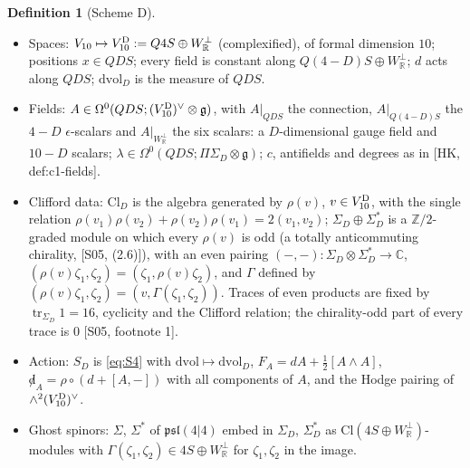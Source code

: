 \documentclass[11pt]{article}
\theoremstyle{definition}
\newtheorem{definition}{Definition}[section]
\numberwithin{equation}{section}
\begin{document}
\begin{definition}[Scheme D]
\label{def:schemeD}
\mbox{}\begin{itemize}
\item Spaces: $V_{10}\mapsto V_{10}^{\rm D}:=Q4S\oplus W^\perp_{\mathbb R}$ (complexified), of formal dimension $10$; positions $x\in QDS$; every field is constant along $Q(4{-}D)S\oplus W^\perp_{\mathbb R}$; $d$ acts along $QDS$; $\mathrm{dvol}_D$ is the measure of $QDS$.
\item Fields: $A\in\Omega^0(QDS;(V_{10}^{\rm D})^\vee\otimes\mathfrak g)$, with $A|_{QDS}$ the connection, $A|_{Q(4-D)S}$ the $4-D$ $\epsilon$-scalars and $A|_{W^\perp_{\mathbb R}}$ the six scalars: a $D$-dimensional gauge field and $10-D$ scalars; $\lambda\in\Omega^0(QDS;\Pi\Sigma_D\otimes\mathfrak g)$; $c$, antifields and degrees as in [HK, def:c1-fields].
\item Clifford data: $\mathrm{Cl}_D$ is the algebra generated by $\rho(v)$, $v\in V_{10}^{\rm D}$, with the single relation $\rho(v_1)\rho(v_2)+\rho(v_2)\rho(v_1)=2(v_1,v_2)$; $\Sigma_D\oplus\Sigma_D^*$ is a $\mathbb Z/2$-graded module on which every $\rho(v)$ is odd (a totally anticommuting chirality, [S05, (2.6)]), with an even pairing $(-,-)\colon\Sigma_D\otimes\Sigma_D^*\to\mathbb C$, $(\rho(v)\zeta_1,\zeta_2)=(\zeta_1,\rho(v)\zeta_2)$, and $\Gamma$ defined by $(\rho(v)\zeta_1,\zeta_2)=(v,\Gamma(\zeta_1,\zeta_2))$. Traces of even products are fixed by $\operatorname{tr}_{\Sigma_D}1=16$, cyclicity and the Clifford relation; the chirality-odd part of every trace is $0$ [S05, footnote 1].
\item Action: $S_D$ is \eqref{eq:S4} with $\mathrm{dvol}\mapsto\mathrm{dvol}_D$, $F_A=dA+\frac12[A\wedge A]$, ${\not d}_A=\rho\circ(d+[A,-])$ with all components of $A$, and the Hodge pairing of $\wedge^2(V_{10}^{\rm D})^\vee$.
\item Ghost spinors: $\Sigma$, $\Sigma^*$ of $\mathfrak{psl}(4|4)$ embed in $\Sigma_D$, $\Sigma_D^*$ as $\mathrm{Cl}(4S\oplus W_{\mathbb R}^\perp)$-modules with $\Gamma(\zeta_1,\zeta_2)\in 4S\oplus W^\perp_{\mathbb R}$ for $\zeta_1,\zeta_2$ in the image.
\end{itemize}
\end{definition}
\end{document}
